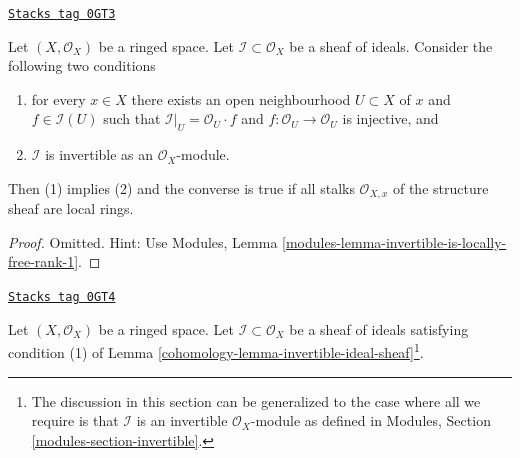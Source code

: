 \begin{lemma}
\label{cohomology-lemma-invertible-ideal-sheaf}
\href{https://stacks.math.columbia.edu/tag/0GT3}{\texttt{Stacks tag 0GT3}}

Let $(X, \mathcal{O}_X)$ be a ringed space. Let
$\mathcal{I} \subset \mathcal{O}_X$ be a sheaf of ideals.
Consider the following two conditions
\begin{enumerate}
\item for every $x \in X$ there exists an open neighbourhood
$U \subset X$ of $x$ and $f \in \mathcal{I}(U)$ such that
$\mathcal{I}|_U = \mathcal{O}_U \cdot f$ and
$f : \mathcal{O}_U \to \mathcal{O}_U$ is injective, and
\item $\mathcal{I}$ is invertible as an $\mathcal{O}_X$-module.
\end{enumerate}
Then (1) implies (2) and the converse is true if all stalks
$\mathcal{O}_{X, x}$ of the structure sheaf are local rings.
\end{lemma}

\begin{proof}
Omitted. Hint: Use Modules, Lemma
\ref{modules-lemma-invertible-is-locally-free-rank-1}.
\end{proof}

\begin{definition}
\label{cohomology-situation-eta}
\href{https://stacks.math.columbia.edu/tag/0GT4}{\texttt{Stacks tag 0GT4}}

Let $(X, \mathcal{O}_X)$ be a ringed space. Let
$\mathcal{I} \subset \mathcal{O}_X$ be a sheaf of ideals
satisfying condition (1) of
Lemma \ref{cohomology-lemma-invertible-ideal-sheaf}\footnote{The discussion
in this section can be generalized to the case where all we
require is that $\mathcal{I}$ is an invertible $\mathcal{O}_X$-module
as defined in Modules, Section \ref{modules-section-invertible}.}.
\end{definition}

